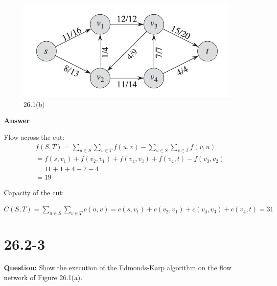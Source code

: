 \documentclass[12pt]{article}
\begin{document}
\begin{figure}[h]
    \centering
    \includegraphics[width=0.5\linewidth]{截屏2024-11-18 下午8.46.37.png}
    \caption{26.1(b)}
    \label{fig:enter-label}

\end{figure}
\textbf{Answer}

Flow across the cut:
\begin{equation}
\begin{aligned}
&f(S,T)=\sum_{u \in S} \sum_{v \in T} f(u,v) - \sum_{u \in S} \sum_{v \in T} f(v, u)  \\
&=f(s,v_1) + f(v_2,v_1)+f(v_4,v_3)+f(v_4,t) - f(v_3,v_2)\\
&=11+1+4+7-4\\
&=19
\end{aligned}
\end{equation}

Capacity of the cut:

 $C(S,T)=\sum_{u \in S} \sum_{v \in T} c(u,v) = c(s,v_1) + c(v_2,v_1) + c(v_4,v_3) + c(v_4,t) = 31$

\section{26.2-3}
\textbf{Question:} Show the execution of the Edmonds-Karp algorithm on the flow network of Figure 26.1(a).
\end{document}
